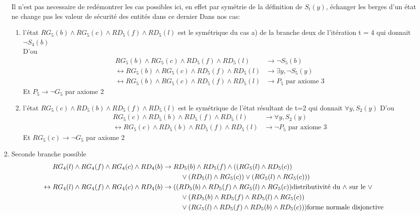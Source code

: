 \documentclass{article}
\begin{document}
\begin{enumerate}
Il n'est pas necessaire de redémontrer les cas possibles ici, en effet par symétrie de la définition de $S_t(y)$, échanger les berges d'un état ne change pas les valeur de sécurité des entités dans ce dernier
Dans nos cas:
\begin{enumerate}
  \item  l'état $RG_5(b) \wedge RG_5(c) \wedge RD_5(f) \wedge RD_5(l)$ est le symétrique du cas a) de la branche deux de l'itération t = 4 qui donnait $\neg S_4(b)$\\
  D'ou
  \begin{align*}
    RG_5(b) \wedge RG_5(c) \wedge RD_5(f) \wedge RD_5(l) &\to \neg S_5(b)\\
    \leftrightarrow RG_5(b) \wedge RG_5(c) \wedge RD_5(f) \wedge RD_5(l) &\to \exists y, \neg S_5(y)\\
    \leftrightarrow RG_5(b) \wedge RG_5(c) \wedge RD_5(f) \wedge RD_5(l) &\to P_5 \text{ par axiome 3}
  \end{align*}
  Et $P_5 \to \neg G_5$ par axiome 2
  \item  l'état $RG_5(c) \wedge RD_5(b) \wedge RD_5(f) \wedge RD_5(l)$ est le symétrique de l'état résultant de t=2 qui donnait $\forall y, S_2(y)$
  D'ou
  \begin{align*}
    RG_5(c) \wedge RD_5(b) \wedge RD_5(f) \wedge RD_5(l) &\to \forall y, S_2(y)\\
    \leftrightarrow RG_5(c) \wedge RD_5(b) \wedge RD_5(f) \wedge RD_5(l) &\to \neg P_5 \text{ par axiome 3}
  \end{align*}
  Et $RG_5(c) \to \neg G_5$ par axiome 2
\end{enumerate}

\item Seconde branche possible
  \begin{align*}
        RG_4(l) \wedge RG_4(f) \wedge RG_4(c) \wedge RD_4(b)&\to RD_5(b) \wedge RD_5(f) \wedge ((RG_5(l)\wedge RD_5(c))\\
        & \hphantom{aaaaa} \vee (RD_5(l)\wedge RG_5(c)) \vee(RG_5(l)\wedge RG_5(c)))\\
        \leftrightarrow RG_4(l) \wedge RG_4(f) \wedge RG_4(c) \wedge RD_4(b) &\to (( RD_5(b) \wedge RD_5(f) \wedge RG_5(l) \wedge RG_5(c))\text{distributivité du $\wedge$ sur le $\vee$}\\
        & \hphantom{aaaaa} \vee (RD_5(b) \wedge RD_5(f) \wedge RD_5(l) \wedge RG_5(c))\\
        & \hphantom{aaaaa} \vee (RG_5(l) \wedge RD_5(f) \wedge RD_5(b) \wedge RD_5(c)))\text{forme normale disjonctive}\\
  \end{align*}



\end{enumerate}
\end{document}
